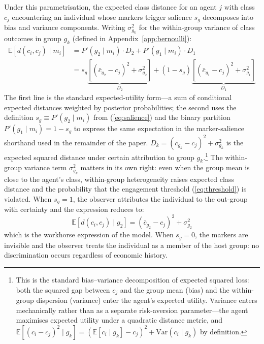 \documentclass[12pt,a4paper]{article}
\theoremstyle{definition}
\numberwithin{proposition}{subsection}
\newcommand{\E}{\mathbb{E}}
\begin{document}
Under this parametrisation, the expected class distance for an
agent $j$ with class $c_j$ encountering an individual whose markers
trigger salience $s_g$ decomposes into bias and variance
components. Writing $\sigma_{g_k}^2$ for the within-group variance
of class outcomes in group $g_k$ (defined in
Appendix~\ref{app:bernoulli}):
\begin{equation}
  \begin{aligned}
  \E[d(c_i, c_j) \mid m_i]
  &= P'(g_2 \mid m_i) \cdot D_2 + P'(g_1 \mid m_i) \cdot D_1 \\
  &= s_g \underbrace{\left[(\bar{c}_{g_2} - c_j)^2 + \sigma_{g_2}^2\right]}_{D_2}
  + (1 - s_g) \underbrace{\left[(\bar{c}_{g_1} - c_j)^2 + \sigma_{g_1}^2\right]}_{D_1}
  \end{aligned}
  \label{eq:Ed-salience}
\end{equation}
The first line is the standard expected-utility form---a sum of
conditional expected distances weighted by posterior probabilities;
the second uses the definition $s_g \equiv P'(g_2 \mid m_i)$ from
(\ref{eq:salience}) and the binary partition $P'(g_1 \mid m_i) = 1 -
s_g$ to express the same expectation in the marker-salience
shorthand used in the remainder of the paper.
$D_k = (\bar{c}_{g_k} - c_j)^2 + \sigma_{g_k}^2$ is the
expected squared distance under certain attribution to group $g_k$.\footnote{This is the standard bias--variance decomposition of expected squared loss: both the squared gap between $c_j$ and the group mean (bias) and the within-group dispersion (variance) enter the agent's expected utility. Variance enters mechanically rather than as a separate risk-aversion parameter---the agent maximises expected utility under a quadratic distance metric, and $\E[(c_i - c_j)^2 \mid g_k] = (\E[c_i \mid g_k] - c_j)^2 + \mathrm{Var}(c_i \mid g_k)$ by definition.}
The within-group variance term $\sigma_{g_k}^2$ matters in its own
right: even when the group mean is close to the agent's class,
within-group heterogeneity raises expected class distance and the
probability that the engagement threshold (\ref{eq:threshold}) is
violated.
When $s_g = 1$, the observer attributes the individual to the
out-group with certainty and the expression reduces to:
\begin{equation}
  \E[d(c_i, c_j) \mid g_2]
  = (\bar{c}_{g_2} - c_j)^2 + \sigma_{g_2}^2
  \label{eq:Ed-group}
\end{equation}
which is the workhorse expression of the model. When $s_g = 0$,
the markers are invisible and the observer treats the individual
as a member of the host group: no discrimination occurs regardless
of economic history.
\end{document}
